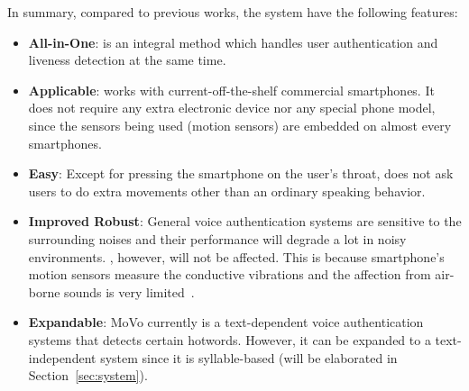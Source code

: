 In summary, compared to previous works, the {\shortname} system have the following features:
\begin{itemize}
	\item  \textbf{All-in-One}: {\shortname} is an integral method which handles user authentication and liveness detection at the same time.
	
	\item  \textbf{Applicable}: {\shortname} works with current-off-the-shelf commercial smartphones. It does not require any extra electronic device nor any special phone model, since the sensors being used (motion sensors) are embedded on almost every smartphones.
	
	\item \textbf{Easy}: Except for pressing the smartphone on the user’s throat, {\shortname} does not ask users to do extra movements other than an ordinary speaking behavior.  
	
	\item \textbf{Improved Robust}: General voice authentication systems are sensitive to the surrounding noises and their performance will degrade a lot in noisy environments. {\shortname}, however, will not be affected. This is because smartphone's motion sensors measure the conductive vibrations and the  affection from air-borne sounds is very limited~\cite{anand2018speechless}.

	\item \textbf{Expandable}: MoVo currently is a  text-dependent voice authentication systems that detects certain hotwords. However, it can be expanded to a text-independent system since it is syllable-based (will be elaborated in Section~\ref{sec:system}).
	
\end{itemize}